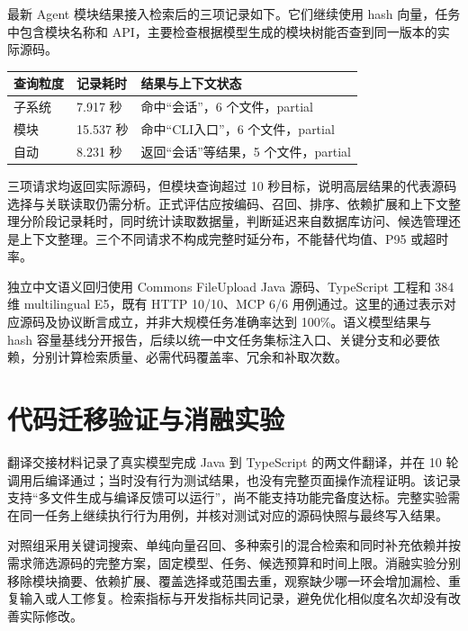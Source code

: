 最新 Agent 模块结果接入检索后的三项记录如下。它们继续使用 hash 向量，任务中包含模块名称和 API，主要检查根据模型生成的模块树能否查到同一版本的实际源码。

\begin{center}\small
\begin{longtable}{P{0.19\textwidth}P{0.33\textwidth}P{0.38\textwidth}}
\toprule
查询粒度 & 记录耗时 & 结果与上下文状态 \\
\midrule\endhead
子系统 & 7.917 秒 & 命中“会话”，6 个文件，partial \\
模块 & 15.537 秒 & 命中“CLI入口”，6 个文件，partial \\
自动 & 8.231 秒 & 返回“会话”等结果，5 个文件，partial \\
\bottomrule
\end{longtable}\end{center}

三项请求均返回实际源码，但模块查询超过 10 秒目标，说明高层结果的代表源码选择与关联读取仍需分析。正式评估应按编码、召回、排序、依赖扩展和上下文整理分阶段记录耗时，同时统计读取数据量，判断延迟来自数据库访问、候选管理还是上下文整理。三个不同请求不构成完整时延分布，不能替代均值、P95 或超时率。

独立中文语义回归使用 Commons FileUpload Java 源码、TypeScript 工程和 384 维 multilingual E5，既有 HTTP 10/10、MCP 6/6 用例通过。这里的通过表示对应源码及协议断言成立，并非大规模任务准确率达到 100\%。语义模型结果与 hash 容量基线分开报告，后续以统一中文任务集标注入口、关键分支和必要依赖，分别计算检索质量、必需代码覆盖率、冗余和补取次数。

\section{代码迁移验证与消融实验}

翻译交接材料记录了真实模型完成 Java 到 TypeScript 的两文件翻译，并在 10 轮调用后编译通过；当时没有行为测试结果，也没有完整页面操作流程证明。该记录支持“多文件生成与编译反馈可以运行”，尚不能支持功能完备度达标。完整实验需在同一任务上继续执行行为用例，并核对测试对应的源码快照与最终写入结果。

对照组采用关键词搜索、单纯向量召回、多种索引的混合检索和同时补充依赖并按需求筛选源码的完整方案，固定模型、任务、候选预算和时间上限。消融实验分别移除模块摘要、依赖扩展、覆盖选择或范围去重，观察缺少哪一环会增加漏检、重复输入或人工修复。检索指标与开发指标共同记录，避免优化相似度名次却没有改善实际修改。

